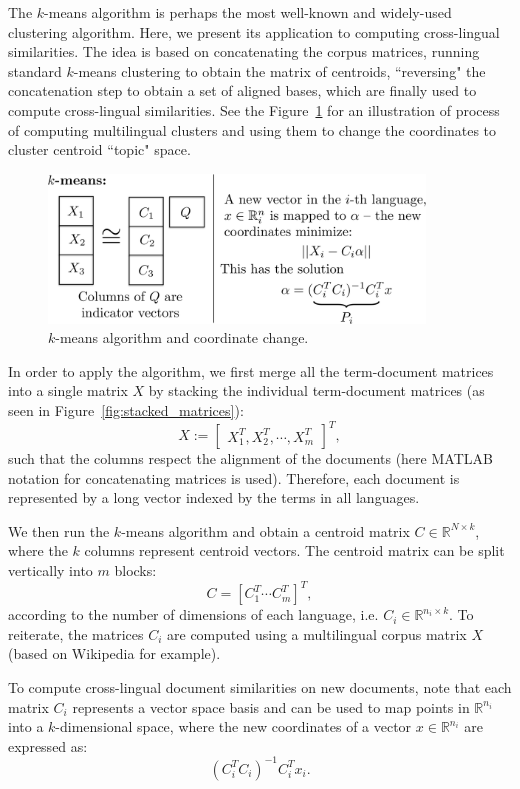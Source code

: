 \documentclass[twoside,11pt]{article}
\newcommand{\RR}{\mathbb{R}}
\begin{document}
The $k$-means algorithm is perhaps the most well-known and widely-used clustering algorithm. Here, we present its application
to computing cross-lingual similarities. The idea is based on concatenating the corpus matrices, running standard $k$-means clustering to obtain the matrix of centroids, ``reversing" the concatenation step to obtain a set of aligned bases, which are finally used to compute cross-lingual similarities. See the Figure~\ref{fig:kmeans} for an illustration of process of computing multilingual clusters and using them to change the coordinates to cluster centroid ``topic" space.

\begin{figure}[tbp]
\centering
\includegraphics[width=10cm]{kmeans.pdf}
\caption{\label{fig:kmeans} $k$-means algorithm and coordinate change.}
\end{figure}

 In order to apply the algorithm, we first merge all the term-document matrices into a single matrix $X$ by stacking the individual term-document matrices (as seen in Figure~\ref{fig:stacked_matrices}):
$$X := \begin{bmatrix}X_1^T ,X_2^T, \cdots, X_m^T \end{bmatrix}^T,$$
such that the columns respect the alignment of the documents (here MATLAB notation for concatenating matrices is used). Therefore, each document  is represented by a long vector indexed by the terms in all languages.

We then run the $k$-means algorithm \cite{kmeans} and obtain a centroid matrix $C \in \RR^{N \times k}$, where the $k$ columns represent centroid vectors. The centroid matrix can be split vertically into $m$ blocks: $$C = [C_1^T \cdots C_m^T]^T,$$ according to the number of dimensions of each language, i.e. $C_i \in \RR^{n_i \times k}$.
%
To reiterate, the matrices $C_i$ are computed using a multilingual corpus matrix $X$ (based on Wikipedia for example).

To compute  cross-lingual document similarities on new documents, note that each matrix $C_i$ represents a vector space basis and can be used to map points in $\RR^{n_i}$ into a $k$-dimensional space, where the new coordinates of a vector $x \in \RR^{n_i}$ are expressed as: $$(C_i^T C_i)^{-1} C_i^T x_i.$$
\end{document}
